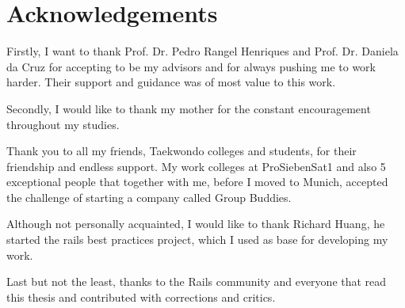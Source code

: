 \thispagestyle{empty}
\chapter*{Acknowledgements}\label{chap:acknowledgements}

Firstly, I want to thank Prof. Dr. Pedro Rangel Henriques and Prof. Dr. Daniela da Cruz 
for accepting to be my advisors and for always pushing me to work harder. 
Their support and guidance was of most value to this work.

Secondly, I would like to thank my mother for the constant encouragement throughout my studies.

Thank you to all my friends, Taekwondo colleges and students, for their friendship and endless support.
My work colleges at ProSiebenSat1 and also 5 exceptional people that together with me, before I moved to Munich, accepted the challenge of starting a company called Group Buddies.

Although not personally acquainted, I would like to thank Richard Huang, he started the rails best practices project, 
which I used as base for developing my work.  

Last but not the least, thanks to the Rails community and everyone that read this thesis and contributed with corrections and critics.